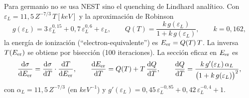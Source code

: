 \documentclass[11pt,a4paper]{article}
\newcommand{\eps}{\varepsilon}
\newcommand{\Tnr}{T}
\newcommand{\Eer}{E_{\rm er}}
\newcommand{\dd}{\mathrm{d}}
\begin{document}
Para germanio no se usa NEST sino el quenching de Lindhard anal\'itico. Con
$\eps_{L} = 11{,}5\,Z^{-7/3}\,\Tnr[\si{keV}]$ y la aproximaci\'on de Robinson
\begin{equation}
  \label{eq:lindhard}
  g(\eps_{L}) = 3\,\eps_{L}^{0{,}15} + 0{,}7\,\eps_{L}^{0{,}6} + \eps_{L},
  \qquad
  Q(\Tnr) = \frac{k\,g(\eps_{L})}{1 + k\,g(\eps_{L})},
  \qquad k = 0{,}162,
\end{equation}
la energ\'ia de ionizaci\'on (``electron-equivalente'') es $\Eer = Q(\Tnr)\,\Tnr$.
La inversa $\Tnr(\Eer)$ se obtiene por bisecci\'on (100 iteraciones). La
secci\'on eficaz en $\Eer$ es
\begin{equation}
  \label{eq:dsdEer}
  \frac{\dd\sigma}{\dd\Eer}
  = \frac{\dd\sigma}{\dd\Tnr}\cdot\frac{\dd\Tnr}{\dd\Eer},
  \qquad
  \frac{\dd\Eer}{\dd\Tnr} = Q(\Tnr) + \Tnr\,\frac{\dd Q}{\dd\Tnr},
  \qquad
  \frac{\dd Q}{\dd\Tnr}
  = \frac{k\,g'(\eps_{L})\,\alpha_{L}}{\bigl(1+k\,g(\eps_{L})\bigr)^{2}},
\end{equation}
con $\alpha_{L}=11{,}5\,Z^{-7/3}$ (en $\si{keV^{-1}}$) y
$g'(\eps_{L}) = 0{,}45\,\eps_{L}^{-0{,}85} + 0{,}42\,\eps_{L}^{-0{,}4} + 1$.
\end{document}
